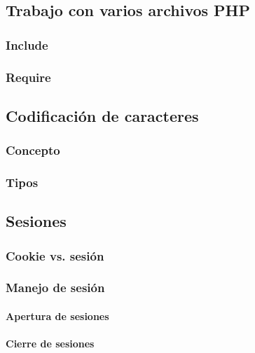 \documentclass[12pt]{report}
\begin{document}
		\subsection{Trabajo con varios archivos PHP}
			\subsubsection{Include}
			\subsubsection{Require}
		\subsection{Codificación de caracteres}
			\subsubsection{Concepto}
			\subsubsection{Tipos}
		\subsection{Sesiones}
			\subsubsection{Cookie vs. sesión}
			\subsubsection{Manejo de sesión}
				\paragraph{Apertura de sesiones}
				\paragraph{Cierre de sesiones}
\end{document}
